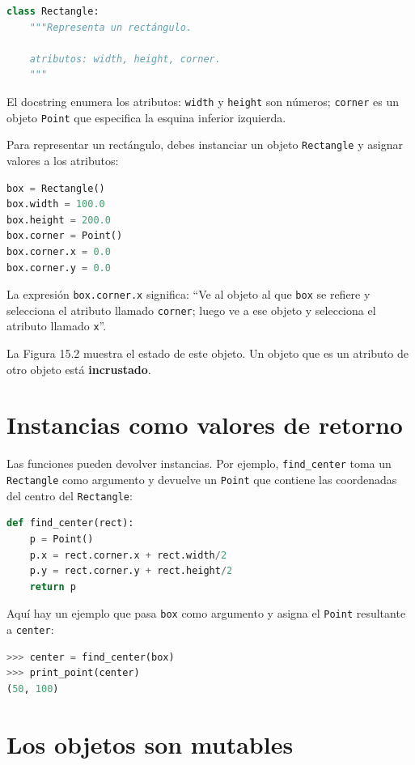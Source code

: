 \begin{lstlisting}[language=Python]
class Rectangle:
    """Representa un rectángulo.
    
    atributos: width, height, corner.
    """
\end{lstlisting}

El docstring enumera los atributos: \texttt{width} y \texttt{height} son números; \texttt{corner} es un objeto \texttt{Point} que especifica la esquina inferior izquierda.

Para representar un rectángulo, debes instanciar un objeto \texttt{Rectangle} y asignar valores a los atributos:

\begin{lstlisting}[language=Python]
box = Rectangle()
box.width = 100.0
box.height = 200.0
box.corner = Point()
box.corner.x = 0.0
box.corner.y = 0.0
\end{lstlisting}

La expresión \texttt{box.corner.x} significa: ``Ve al objeto al que \texttt{box} se refiere y selecciona el atributo llamado \texttt{corner}; luego ve a ese objeto y selecciona el atributo llamado \texttt{x}''.

La Figura 15.2 muestra el estado de este objeto. Un objeto que es un atributo de otro objeto está \textbf{incrustado}.

\section{Instancias como valores de retorno}

Las funciones pueden devolver instancias. Por ejemplo, \texttt{find\_center} toma un \texttt{Rectangle} como argumento y devuelve un \texttt{Point} que contiene las coordenadas del centro del \texttt{Rectangle}:

\begin{lstlisting}[language=Python]
def find_center(rect):
    p = Point()
    p.x = rect.corner.x + rect.width/2
    p.y = rect.corner.y + rect.height/2
    return p
\end{lstlisting}

Aquí hay un ejemplo que pasa \texttt{box} como argumento y asigna el \texttt{Point} resultante a \texttt{center}:

\begin{lstlisting}[language=Python]
>>> center = find_center(box)
>>> print_point(center)
(50, 100)
\end{lstlisting}

\section{Los objetos son mutables}

